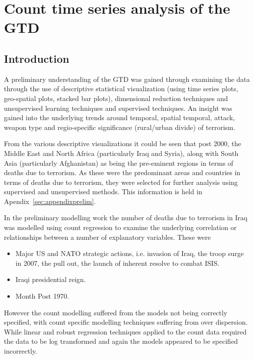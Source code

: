 \chapter[Count time series aberration techniques]{Count time series analysis of the GTD}

\section{Introduction}
\label{sec:chap5intro}

A preliminary understanding of the GTD was gained through examining the data through the use of descriptive statistical visualization (using time series plots, geo-spatial plots, stacked bar plots), dimensional reduction techniques and unsupervised learning techniques and supervised techniques. An insight was gained into the underlying trends around temporal, spatial temporal, attack, weapon type and regio-specific significance (rural/urban divide) of terrorism. 

From the various descriptive visualizations it could be seen that post 2000, the Middle East and North Africa (particularly Iraq and Syria), along with South Asia (particularly Afghanistan) as being the pre-eminent regions in terms of deaths due to terrorism. As these were the predominant areas and countries in terms of deaths due to terrorism, they were selected for further analysis using supervised and unsupervised methods. This information is held in Apendix~\ref{sec:appendixprelim}.

In the preliminary modelling work the number of deaths due to terrorism in Iraq was modelled using count regression to examine the underlying correlation or relationships between a number of explanatory variables. These were 
\begin{itemize}
\item Major US and NATO strategic actions, i.e. invasion of Iraq, the troop surge in 2007, the pull out, the launch of inherent resolve to combat ISIS.
\item Iraqi presidential reign.
\item Month Post 1970.
\end{itemize}

However the count modelling suffered from the models not being correctly specified, with count specific modelling techniques suffering from over dispersion. While linear and robust regression techniques applied to the count data required the data to be log transformed and again the models appeared to be specified incorrectly.   

